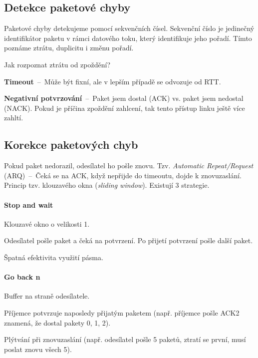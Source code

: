 \subsection{Detekce paketové chyby}

Paketové chyby detekujeme pomocí sekvenčních čísel. Sekvenční číslo je jedinečný identifikátor paketu v rámci datového toku, který identifikuje jeho pořadí. Tímto poznáme ztrátu, duplicitu i změnu pořadí.

\medskip\noindent Jak rozpoznat ztrátu od zpoždění? \begin{compactitem}
    \item \textbf{Timeout}~--~Může být fixní, ale v lepším případě se odvozuje od RTT.
    \item \textbf{Negativní potvrzování}~--~Paket jsem dostal (ACK) vs. paket jsem nedostal (NACK). Pokud je příčina zpoždění zahlcení, tak tento přístup linku ještě více zahltí.
\end{compactitem}

\subsection{Korekce paketových chyb}

Pokud paket nedorazil, odesílatel ho pošle znovu. Tzv. \textit{Automatic Repeat/Request} (ARQ)~--~Čeká se na ACK, když nepřijde do timeoutu, dojde k znovuzaslání. Princip tzv. klouzavého okna (\textit{sliding window}). Existují 3 strategie.

\paragraph*{Stop and wait} \begin{compactitem}
    \item Klouzavé okno o velikosti 1.
    \item Odesílatel pošle paket a čeká na potvrzení. Po přijetí potvrzení pošle další paket.
    \item Špatná efektivita využití pásma.
\end{compactitem}

\paragraph*{Go back n} \begin{compactitem}
    \item Buffer na straně odesílatele.
    \item Příjemce potvrzuje naposledy přijatým paketem (např. příjemce pošle ACK2 znamená, že dostal pakety 0, 1, 2).
    \item Plýtvání při znovuzaslání (např. odesílatel pošle 5 paketů, ztratí se první, musí poslat znovu všech 5).
\end{compactitem}

